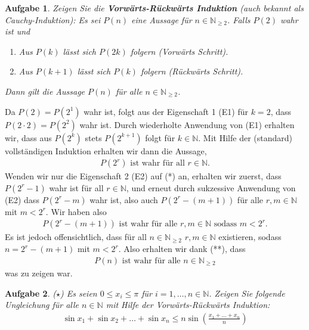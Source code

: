 \documentclass[a4paper, 20]{exam}
\newtheorem{ex}{Aufgabe}
\begin{document}
\begin{ex} Zeigen Sie die \textbf{Vorwärts-Rückwärts Induktion} (auch bekannt als Cauchy-Induktion): Es sei $P(n)$ eine Aussage für $n \in \mathbb{N}_{ \geq 2}$. Falls $P(2)$ wahr ist und 
\begin{enumerate}
\item Aus $P(k)$ lässt sich $P(2k)$ folgern (Vorwärts Schritt).
\item Aus $P(k+1)$ lässt sich $P(k)$ folgern (Rückwärts Schritt).
\end{enumerate}
Dann gilt die Aussage $P(n)$ für alle $n \in \mathbb{N}_{ \geq 2}$.
\end{ex}
\begin{solution} Da $P(2)=P(2^1)$ wahr ist, folgt aus der Eigenschaft 1 (E1) für $k=2$, dass $P(2\cdot 2)=P(2^2)$ wahr ist. Durch wiederholte Anwendung von (E1) erhalten wir, dass aus $P(2^k)$ stets $P(2^{k+1})$ folgt für $k \in \mathbb{N}$. Mit Hilfe der (standard) vollständigen Induktion erhalten wir dann die Aussage,
\begin{align*}
P(2^r) \text{ ist wahr für all } r \in \mathbb{N}. \tag{*}
\end{align*}
Wenden wir nur die Eigenschaft 2 (E2) auf (*) an, erhalten wir zuerst, dass $P(2^r-1)$ wahr ist für all $r \in \mathbb{N}$, und erneut durch sukzessive Anwendung von (E2) dass $P(2^r-m)$ wahr ist, also auch $P(2^r-(m+1))$ für alle $r,m \in \mathbb{N}$ mit $m < 2^r$. Wir haben also 
\begin{align*}
P(2^r-(m+1)) \text{ ist wahr für alle }r,m \in \mathbb{N} \text{ sodass } m < 2^r. \tag{**}
\end{align*}
Es ist jedoch offensichtlich, dass für all $n \in \mathbb{N}_{\geq 2}$ $r,m \in \mathbb{N}$ existieren, sodass $n= 2^r-(m+1)$ mit $m<2^r$. Also erhalten wir dank (**), dass 
\begin{align*}
P(n) \text{ ist wahr für alle } n \in \mathbb{N}_{ \geq 2}
\end{align*}
was zu zeigen war.
\end{solution}

\begin{ex}{($\star$)} Es seien $0 \leq x_i \leq \pi$ für $i=1, \dots , n \in \mathbb{N}$. Zeigen Sie folgende Ungleichung für alle $n \in \mathbb{N}$ mit Hilfe der Vorwärts-Rückwärts Induktion: 
\begin{align*}
\sin x_1 + \sin x_2 + \dots + \sin x_n \leq n \sin \left( \frac{x_1 + \dots + x_n}{n}\right)
\end{align*}
\end{ex}
\end{document}

